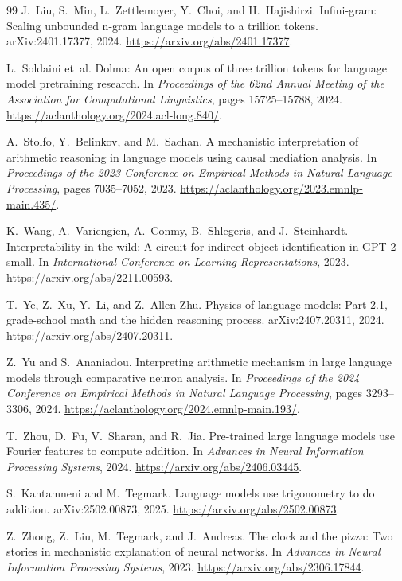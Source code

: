 \documentclass[11pt]{article}
\begin{document}
\begin{thebibliography}{99}
J.~Liu, S.~Min, L.~Zettlemoyer, Y.~Choi, and H.~Hajishirzi.
\newblock Infini-gram: Scaling unbounded n-gram language models to a trillion tokens.
\newblock arXiv:2401.17377, 2024.
\newblock \url{https://arxiv.org/abs/2401.17377}.

L.~Soldaini et~al.
\newblock Dolma: An open corpus of three trillion tokens for language model pretraining research.
\newblock In \emph{Proceedings of the 62nd Annual Meeting of the Association for Computational Linguistics}, pages 15725--15788, 2024.
\newblock \url{https://aclanthology.org/2024.acl-long.840/}.

A.~Stolfo, Y.~Belinkov, and M.~Sachan.
\newblock A mechanistic interpretation of arithmetic reasoning in language models using causal mediation analysis.
\newblock In \emph{Proceedings of the 2023 Conference on Empirical Methods in Natural Language Processing}, pages 7035--7052, 2023.
\newblock \url{https://aclanthology.org/2023.emnlp-main.435/}.

K.~Wang, A.~Variengien, A.~Conmy, B.~Shlegeris, and J.~Steinhardt.
\newblock Interpretability in the wild: A circuit for indirect object identification in GPT-2 small.
\newblock In \emph{International Conference on Learning Representations}, 2023.
\newblock \url{https://arxiv.org/abs/2211.00593}.

T.~Ye, Z.~Xu, Y.~Li, and Z.~Allen-Zhu.
\newblock Physics of language models: Part 2.1, grade-school math and the hidden reasoning process.
\newblock arXiv:2407.20311, 2024.
\newblock \url{https://arxiv.org/abs/2407.20311}.

Z.~Yu and S.~Ananiadou.
\newblock Interpreting arithmetic mechanism in large language models through comparative neuron analysis.
\newblock In \emph{Proceedings of the 2024 Conference on Empirical Methods in Natural Language Processing}, pages 3293--3306, 2024.
\newblock \url{https://aclanthology.org/2024.emnlp-main.193/}.

T.~Zhou, D.~Fu, V.~Sharan, and R.~Jia.
\newblock Pre-trained large language models use Fourier features to compute addition.
\newblock In \emph{Advances in Neural Information Processing Systems}, 2024.
\newblock \url{https://arxiv.org/abs/2406.03445}.

S.~Kantamneni and M.~Tegmark.
\newblock Language models use trigonometry to do addition.
\newblock arXiv:2502.00873, 2025.
\newblock \url{https://arxiv.org/abs/2502.00873}.

Z.~Zhong, Z.~Liu, M.~Tegmark, and J.~Andreas.
\newblock The clock and the pizza: Two stories in mechanistic explanation of neural networks.
\newblock In \emph{Advances in Neural Information Processing Systems}, 2023.
\newblock \url{https://arxiv.org/abs/2306.17844}.

\end{thebibliography}
\end{document}
